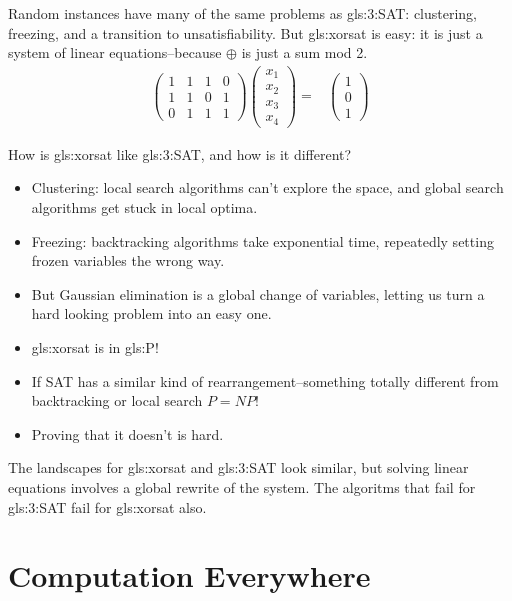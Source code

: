 \documentclass[]{article}
\begin{document}
Random instances have many of the same problems as \gls{gls:3:SAT}: clustering, freezing, and a transition to unsatisfiability. But \gls{gls:xorsat} is easy: it is just a system of linear equations--because $\oplus$ is just a sum mod 2.
\begin{align*}
	\begin{pmatrix}
		1&1&1&0\\
		1&1&0&1\\
		0&1&1&1
	\end{pmatrix}\begin{pmatrix}
		x_1\\
		x_2\\
		x_3\\
		x_4
	\end{pmatrix}=&\begin{pmatrix}
		1\\
		0\\
		1
	\end{pmatrix}
\end{align*}

How is \gls{gls:xorsat} like \gls{gls:3:SAT}, and how is it different?
\begin{itemize}
	\item Clustering: local search algorithms can't explore the space, and global search algorithms get stuck in local optima.
	\item Freezing: backtracking algorithms take exponential time, repeatedly setting frozen variables the wrong way.
	\item 	But Gaussian elimination is a global change of variables, letting us turn a hard looking problem into an easy one.
	\item \gls{gls:xorsat} is in \gls{gls:P}!
	\item If SAT has a similar kind of rearrangement--something totally different from backtracking or local search $P=NP$!
	\item Proving that it doesn't is hard.
\end{itemize}

The landscapes for \gls{gls:xorsat} and \gls{gls:3:SAT} look similar, but solving linear equations involves a global rewrite of the system. The algoritms that fail for \gls{gls:3:SAT} fail for \gls{gls:xorsat} also.
\section{Computation Everywhere}
\cite[Chapter 7]{moore2011nature}


\printglossaries

 

\raggedright
{}

\end{document}
